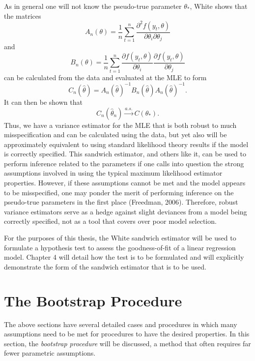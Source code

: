 		As in general one will not know the pseudo-true parameter $\theta_*$, White shows that the matrices
		\begin{equation}
			A_n(\theta) = \frac{1}{n} \sum_{t=1}^{n} \frac{\partial^2 f(y_t,\theta)}{\partial \theta_i \partial \theta_j}
		\end{equation}
		and
		\begin{equation}
			B_n(\theta) = \frac{1}{n} \sum_{t=1}^{n} \frac{\partial f(y_t,\theta)}{\partial \theta_i} \frac{\partial f(y_t,\theta)}{\partial \theta_j} 
		\end{equation}
		can be calculated from the data and evaluated at the MLE to form
		\begin{equation}
			C_n(\hat{\theta}) = A_n(\hat{\theta})^{-1} B_n(\hat{\theta}) A_n(\hat{\theta})^{-1} .
		\end{equation}
		It can then be shown that 
		\begin{equation}
			C_n(\hat{\theta}_n) \xrightarrow[]{a.s.} C(\theta_* ) .
		\end{equation}
		Thus, we have a variance estimator for the MLE that is both robust to much misspecification and can be calculated using the data, but yet also will be approximately equivalent to using standard
		likelihood theory results if the model is correctly specified. This sandwich estimator, and others like it, can be used to perform inference related to the parameters if one calls into question
		the strong assumptions involved in using the typical maximum likelihood estimator properties. However, if these assumptions cannot be met and the model appears to be misspecified, one may ponder
		the merit of performing inference on the pseudo-true parameters in the first place (Freedman, 2006). Therefore, robust variance estimators serve as a hedge against slight deviances from a model
		being correctly specified, not as a tool that covers over poor model selection.

		For the purposes of this thesis, the White sandwich estimator will be used to formulate a hypothesis test to assess the goodness-of-fit of a linear regression model. Chapter 4 will detail how
		the test is to be formulated and will explicitly demonstrate the form of the sandwich estimator that is to be used.

		\section{The Bootstrap Procedure}

		The above sections have several detailed cases and procedures in which many assumptions need to be met for procedures to have the desired properties. In this section, the \textit{bootstrap procedure} will
		be discussed, a method that often requires far fewer parametric assumptions.
		
